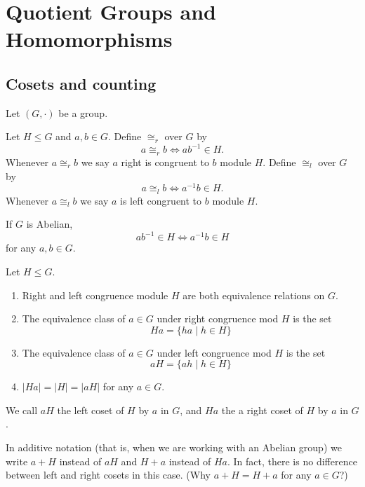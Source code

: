 \documentclass[11pt,a4paper]{article}
\begin{document}
\def\contador{Lesson 6}


\section{Quotient Groups and Homomorphisms}

\subsection{Cosets and counting}

Let \((G,\cdot)\) be a group.


\begin{defi}
Let \(H\leq G\) and \(a,b\in G\).
Define \(\cong_r\) over \(G\) by 
\[a\cong_r b\iff ab^{-1}\in H.\]
Whenever \(a\cong_r b\) we say \(a\) right is congruent to \(b\) module \(H\).
Define \(\cong_l\) over \(G\) by 
\[a\cong_l b\iff a^{-1}b\in H.\]
Whenever \(a\cong_l b\) we say \(a\) is left congruent to \(b\) module \(H\).
\end{defi}

\begin{rem}
    If \(G\) is Abelian, \[ab^{-1}\in H\iff a^{-1}b\in H\]
    for any \(a,b\in G\).
\end{rem}


\begin{teo}
    Let \(H\leq G\).
    \begin{enumerate}[label=(\roman*)]
        \item Right and left congruence module $H$ are both equivalence relations on $G$.
    \item The equivalence class of $a \in G$ under right  congruence mod $H$ is the set
    \[
    Ha = \{ha \mid h \in H\}  
    \]
    \item The equivalence class of $a \in G$ under left congruence mod $H$ is the set
    \[
     aH = \{ah \mid h \in H\}
    \]

    \item \(\left|H a\right|=|H|=|a H|\) for any \(a\in G\).
    \end{enumerate}
\end{teo}

We call \(aH\) the  left coset of \(H\) by \(a\) in \(G\), and \(Ha\) the a right coset of \(H\) by \(a\) in \(G\). 

\begin{rem}
    In additive notation (that is, when we are working with an Abelian group) we write \(a+H\) instead of \(aH\) and \(H+a\) instead of \(Ha\).
    In fact, there is no difference between left and right cosets in this case. (Why \(a+ H = H + a\) for any \(a\in G\)?)
\end{rem}
 
\end{document}
